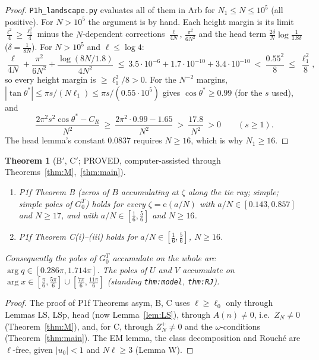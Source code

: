 \documentclass[11pt]{article}
\newtheorem{theorem}{Theorem}\newtheorem{lemma}[theorem]{Lemma}\newtheorem{proposition}[theorem]{Proposition}
\theoremstyle{remark}\newtheorem{remark}[theorem]{Remark}
\newcommand{\e}{\mathrm{e}}
\begin{document}
\begin{proof}
\texttt{P1h\_landscape.py} evaluates all of them in Arb for $N_1\le N\le10^5$ (all positive). For $N>10^5$ the argument is by hand. Each height margin is its limit $\frac{\ell^2}4\ge\frac{\ell_1^2}4$ minus the $N$-dependent corrections $\frac{\ell}{4N}$, $\frac{\pi^2}{6N^2}$ and the head term $\frac{2\delta}N\log\frac1{1.8\delta}$ ($\delta=\frac1{8N}$). For $N>10^5$ and $\ell\le\log4$:
\[
\frac{\ell}{4N}+\frac{\pi^2}{6N^2}+\frac{\log(8N/1.8)}{4N^2}\ \le\ 3.5\cdot10^{-6}+1.7\cdot10^{-10}+3.4\cdot10^{-10}\ <\ \frac{0.55^2}{8}\ \le\ \frac{\ell_1^2}8,
\]
so every height margin is $\ge\ell_1^2/8>0$. For the $N^{-2}$ margins, $|\tan\theta^*|\le\pi s/(N\ell_1)\le\pi s/(0.55\cdot10^5)$ gives $\cos\theta^*\ge0.99$ (for the $s$ used), and
\[
\frac{2\pi^2s^2\cos\theta^*-C_R}{N^2}\ \ge\ \frac{2\pi^2\cdot0.99-1.65}{N^2}\ >\ \frac{17.8}{N^2}\ >0\qquad(s\ge1).
\]
The head lemma's constant $0.0837$ requires $N\ge16$, which is why $N_1\ge16$.
\end{proof}

\begin{theorem}[B$'$, C$'$; PROVED, computer-assisted through Theorems~\ref{thm:M},~\ref{thm:main}]
\begin{enumerate}
\item P1f Theorem B (zeros of $B$ accumulating at $\zeta$ along the tie ray; simple; simple poles of $G^T_0$) holds for every $\zeta=\e(a/N)$ with $a/N\in[0.143,0.857]$ and $N\ge17$, and with $a/N\in[\frac16,\frac56]$ and $N\ge16$.
\item P1f Theorem C(i)--(iii) holds for $a/N\in[\frac16,\frac56]$, $N\ge16$.
\end{enumerate}
Consequently the poles of $G^T_0$ accumulate on the whole arc $\arg q\in[0.286\pi,1.714\pi]$. The poles of $U$ and $V$ accumulate on $\arg x\in[\frac\pi6,\frac{5\pi}6]\cup[\frac{7\pi}6,\frac{11\pi}6]$ (standing \texttt{thm:model}, \texttt{thm:RJ}).
\end{theorem}
\begin{proof}
The proof of P1f Theorems asym, B, C uses $\ell\ge\ell_0$ only through Lemmas LS, LSp, head (now Lemma~\ref{lem:LS}), through $A(n)\ne0$, i.e.\ $Z_N\ne0$ (Theorem~\ref{thm:M}), and, for C, through $Z^+_N\ne0$ and the $\omega$-conditions (Theorem~\ref{thm:main}).
The EM lemma, the class decomposition and Rouch\'e are $\ell$-free, given $|u_0|<1$ and $N\ell\ge3$ (Lemma W).
\end{proof}
\end{document}
